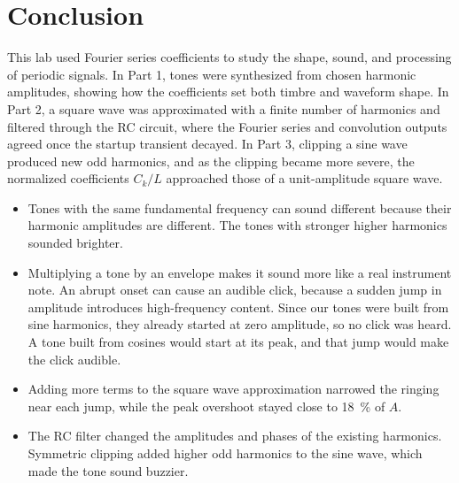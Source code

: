 \documentclass[11pt, a4paper]{article}
\begin{document}
\section*{Conclusion}

This lab used Fourier series coefficients to study the shape, sound, and processing of periodic signals. In Part 1, tones were synthesized from chosen harmonic amplitudes, showing how the coefficients set both timbre and waveform shape. In Part 2, a square wave was approximated with a finite number of harmonics and filtered through the RC circuit, where the Fourier series and convolution outputs agreed once the startup transient decayed. In Part 3, clipping a sine wave produced new odd harmonics, and as the clipping became more severe, the normalized coefficients $C_k/L$ approached those of a unit-amplitude square wave.

\begin{itemize}
    \item Tones with the same fundamental frequency can sound different because their harmonic amplitudes are different. The tones with stronger higher harmonics sounded brighter.
    \item Multiplying a tone by an envelope makes it sound more like a real instrument note. An abrupt onset can cause an audible click, because a sudden jump in amplitude introduces high-frequency content. Since our tones were built from sine harmonics, they already started at zero amplitude, so no click was heard. A tone built from cosines would start at its peak, and that jump would make the click audible.
    \item Adding more terms to the square wave approximation narrowed the ringing near each jump, while the peak overshoot stayed close to \SI{18}{\percent} of $A$.
    \item The RC filter changed the amplitudes and phases of the existing harmonics. Symmetric clipping added higher odd harmonics to the sine wave, which made the tone sound buzzier.
\end{itemize}
\end{document}
